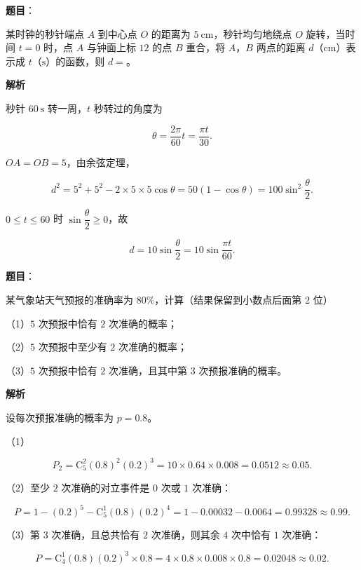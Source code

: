 \begin{answer}

\textbf{题目}：

某时钟的秒针端点 $A$ 到中心点 $O$ 的距离为 $5\ \mathrm{cm}$，秒针均匀地绕点 $O$ 旋转，当时间 $t=0$ 时，点 $A$ 与钟面上标 $12$ 的点 $B$ 重合，将 $A$，$B$ 两点的距离 $d$（$\mathrm{cm}$）表示成 $t$（$\mathrm{s}$）的函数，则 $d=$\gkblank{}。

\textbf{解析}

秒针 $60\ \mathrm s$ 转一周，$t$ 秒转过的角度为

\nopagebreak[4]
\[\theta=\frac{2\pi}{60}t=\frac{\pi t}{30}.\]

$OA=OB=5$，由余弦定理，

\nopagebreak[4]
\[d^2=5^2+5^2-2\times5\times5\cos\theta=50(1-\cos\theta)=100\sin^2\frac{\theta}{2}.\]

$0\leqslant t\leqslant60$ 时 $\sin\dfrac{\theta}{2}\geqslant0$，故

\nopagebreak[4]
\[d=10\sin\frac{\theta}{2}=10\sin\frac{\pi t}{60}.\]


\end{answer}
\begin{answer}

\textbf{题目}：

某气象站天气预报的准确率为 $80\%$，计算（结果保留到小数点后面第 $2$ 位）

（1）$5$ 次预报中恰有 $2$ 次准确的概率；

（2）$5$ 次预报中至少有 $2$ 次准确的概率；

（3）$5$ 次预报中恰有 $2$ 次准确，且其中第 $3$ 次预报准确的概率。

\textbf{解析}

设每次预报准确的概率为 $p=0.8$。

（1）

\nopagebreak[4]
\[P_2=\mathrm C_5^2(0.8)^2(0.2)^3=10\times0.64\times0.008=0.0512\approx0.05.\]

（2）至少 $2$ 次准确的对立事件是 $0$ 次或 $1$ 次准确：

\nopagebreak[4]
\[P=1-(0.2)^5-\mathrm C_5^1(0.8)(0.2)^4=1-0.00032-0.0064=0.99328\approx0.99.\]

（3）第 $3$ 次准确，且总共恰有 $2$ 次准确，则其余 $4$ 次中恰有 $1$ 次准确：

\nopagebreak[4]
\[P=\mathrm C_4^1(0.8)(0.2)^3\times0.8=4\times0.8\times0.008\times0.8=0.02048\approx0.02.\]


\end{answer}
